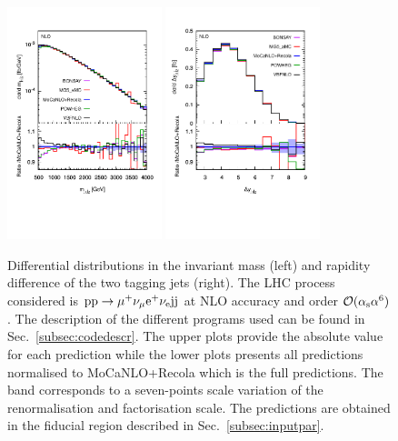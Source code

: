  \begin{figure}[hbt!]
   \centering
   \includegraphics[width=0.4\textwidth,angle=0,clip=true,trim={0.4cm 2cm 0.cm 1.cm}]{figures/NLO/mjj_NLO.pdf}
   \includegraphics[width=0.4\textwidth,angle=0,clip=true,trim={0.4cm 2cm 0.cm 1.cm}]{figures/NLO/dyj1j2_NLO.pdf}
\caption{\label{fig:distNLO1} Differential distributions in the invariant mass (left) and rapidity difference of the two tagging jets (right).
The LHC process considered is ${\rm p}{\rm p}\to\mu^+\nu_\mu{\rm e}^+\nu_{\rm e}{\rm j}{\rm j}$ at NLO accuracy and order $\mathcal{O}(\alpha_{\rm s}\alpha^6)$.
The description of the different programs used can be found in Sec.~\ref{subsec:codedescr}.
The upper plots provide the absolute value for each prediction while the lower plots presents all predictions normalised to {\sc MoCaNLO}+{\sc Recola} which is the full predictions.
The band corresponds to a seven-points scale variation of the renormalisation and factorisation scale.
The predictions are obtained in the fiducial region described in Sec.~\ref{subsec:inputpar}.
}
\end{figure}

